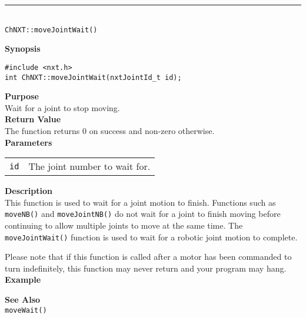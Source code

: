 \noindent
\vspace{5pt}
\rule{4.5in}{0.015in}\\
\noindent
{\LARGE \texttt{ChNXT::moveJointWait()}}\\
{}

\noindent
{\bf Synopsis}
\begin{lstlisting}
#include <nxt.h>
int ChNXT::moveJointWait(nxtJointId_t id);
\end{lstlisting}

\noindent
{\bf Purpose}\\
Wait for a joint to stop moving.\\

\noindent
{\bf Return Value}\\
The function returns 0 on success and non-zero otherwise.\\

\noindent
{\bf Parameters}
\vspace{-0.1in}
\begin{description}
\item               
\begin{tabular}{p{10 mm}p{145 mm}}
\texttt{id} & The joint number to wait for. \\
\end{tabular}
\end{description}

\noindent
{\bf Description}\\
This function is used to wait for a joint motion to finish. Functions such as
\texttt{moveNB()} and \texttt{moveJointNB()} do not wait for a joint to finish
moving before continuing to allow multiple joints to move at the same time. The
\texttt{moveJointWait()} function is used to wait for a 
robotic joint motion to complete.

Please note that if this function is called after a motor has been commanded to
turn indefinitely, this function may never return and your program may hang.\\

\noindent
{\bf Example}

\noindent
{\bf See Also}\\
\texttt{moveWait()}

